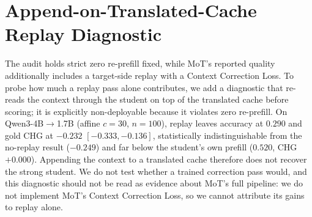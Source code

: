 \documentclass[10pt]{article}
\begin{document}
\section{Append-on-Translated-Cache Replay Diagnostic}
\label{app:replay}
The audit holds strict zero re-prefill fixed, while MoT's reported quality
additionally includes a target-side replay with a Context Correction Loss. To
probe how much a replay pass alone contributes, we add a diagnostic that
re-reads the context through the student on top of the translated cache before
scoring; it is explicitly non-deployable because it violates zero re-prefill.
On Qwen3-4B$\to$1.7B (affine $c{=}30$, $n{=}100$), replay leaves accuracy at
$0.290$ and gold CHG at $-0.232$ $[-0.333, -0.136]$, statistically
indistinguishable from the no-replay result ($-0.249$) and far below the
student's own prefill ($0.520$, CHG $+0.000$). Appending the context to a
translated cache therefore does not recover the strong student. We do not test
whether a trained correction pass would, and this diagnostic should not be read
as evidence about MoT's full pipeline: we do not implement MoT's Context
Correction Loss, so we cannot attribute its gains to replay alone.
\end{document}
